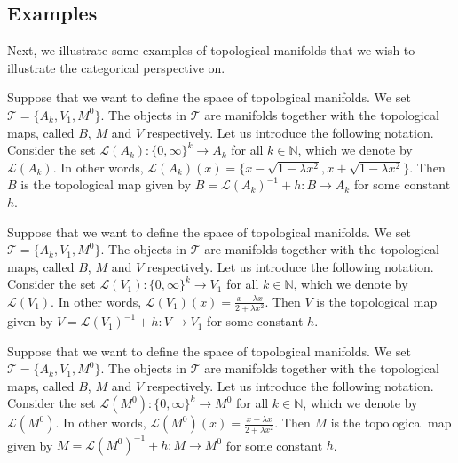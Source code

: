 \documentclass[a4paper,reqno,oneside]{article}
\begin{document}
\subsection*{Examples} 
Next, we illustrate some examples of topological manifolds that we wish to illustrate the categorical perspective on. 

\begin{example}
    \label{fig:top-manifold}
    Suppose that we want to define the space of topological manifolds. We set $\mathcal{T} = \{A_k, V_1, M^0\}$. The objects in $\mathcal{T}$ are manifolds together with the topological maps, called $B$, $M$ and $V$ respectively. Let us introduce the following notation. Consider the set $\mathcal{L}(A_k): \{0,\infty\}^k \to A_k$ for all $k \in \mathbb{N}$, which we denote by $\mathcal{L}(A_k)$. In other words, $\mathcal{L}(A_k)(x) = \{ x - \sqrt{1-\lambda x^2}, x + \sqrt{1-\lambda x^2}\}$. Then $B$ is the topological map given by $B = \mathcal{L}(A_k)^{-1} + h: B \to A_k$ for some constant $h$. 
\end{example}

\begin{example}
    Suppose that we want to define the space of topological manifolds. We set $\mathcal{T} = \{A_k, V_1, M^0\}$. The objects in $\mathcal{T}$ are manifolds together with the topological maps, called $B$, $M$ and $V$ respectively. Let us introduce the following notation. Consider the set $\mathcal{L}(V_1): \{0,\infty\}^k \to V_1$ for all $k \in \mathbb{N}$, which we denote by $\mathcal{L}(V_1)$. In other words, $\mathcal{L}(V_1)(x) = \frac{x - \lambda x}{2 + \lambda x^2}$. Then $V$ is the topological map given by $V = \mathcal{L}(V_1)^{-1} + h: V \to V_1$ for some constant $h$. 
\end{example}

\begin{example}
    Suppose that we want to define the space of topological manifolds. We set $\mathcal{T} = \{A_k, V_1, M^0\}$. The objects in $\mathcal{T}$ are manifolds together with the topological maps, called $B$, $M$ and $V$ respectively. Let us introduce the following notation. Consider the set $\mathcal{L}(M^0): \{0,\infty\}^k \to M^0$ for all $k \in \mathbb{N}$, which we denote by $\mathcal{L}(M^0)$. In other words, $\mathcal{L}(M^0)(x) = \frac{x + \lambda x}{2 + \lambda x^2}$. Then $M$ is the topological map given by $M = \mathcal{L}(M^0)^{-1} + h: M \to M^0$ for some constant $h$. 
\end{example}

\end{document}
